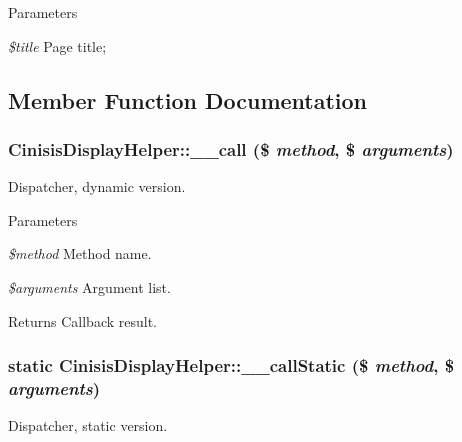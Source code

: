 \begin{DoxyParams}{Parameters}
\item[{\em \$title}]Page title; \end{DoxyParams}


\subsection{Member Function Documentation}
\hypertarget{classCinisisDisplayHelper_a5601da7181ece90313c1abe2fd0ae621}{
\subsubsection[{\_\-\_\-call}]{\setlength{\rightskip}{0pt plus 5cm}CinisisDisplayHelper::\_\-\_\-call (\$ {\em method}, \/  \$ {\em arguments})}}
\label{classCinisisDisplayHelper_a5601da7181ece90313c1abe2fd0ae621}
Dispatcher, dynamic version.


\begin{DoxyParams}{Parameters}
\item[{\em \$method}]Method name.\item[{\em \$arguments}]Argument list.\end{DoxyParams}
\begin{DoxyReturn}{Returns}
Callback result. 
\end{DoxyReturn}
\hypertarget{classCinisisDisplayHelper_abae906d7606b7d76ef5ed754835ba7e2}{
\subsubsection[{\_\-\_\-callStatic}]{\setlength{\rightskip}{0pt plus 5cm}static CinisisDisplayHelper::\_\-\_\-callStatic (\$ {\em method}, \/  \$ {\em arguments})}}
\label{classCinisisDisplayHelper_abae906d7606b7d76ef5ed754835ba7e2}
Dispatcher, static version.


